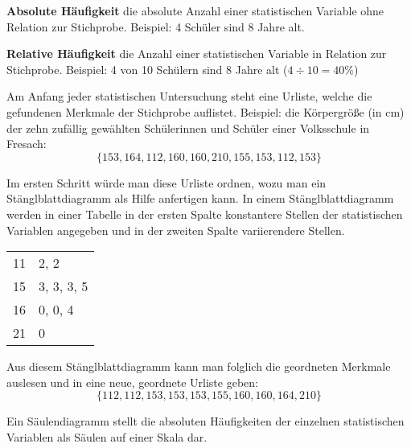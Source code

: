 \textbf{Absolute H\"{a}ufigkeit}  die absolute Anzahl einer statistischen Variable ohne Relation zur Stichprobe. Beispiel: 4 Sch\"{u}ler sind 8 Jahre alt.

\textbf{Relative H\"{a}ufigkeit}  die Anzahl einer statistischen Variable in Relation zur Stichprobe. Beispiel: 4 von 10 Sch\"{u}lern sind 8 Jahre alt ($4 \div 10 = 40\%$)

\pagebreak



Am Anfang jeder statistischen Untersuchung steht eine Urliste, welche die gefundenen Merkmale der Stichprobe auflistet. Beispiel: die K\"{o}rpergr\"{o}\ss{}e (in cm) der zehn zuf\"{a}llig gew\"{a}hlten Sch\"{u}lerinnen und Sch\"{u}ler einer Volksschule in Fresach: $$\{ 153, 164, 112, 160, 160, 210, 155, 153, 112, 153 \}$$


Im ersten Schritt w\"{u}rde man diese Urliste ordnen, wozu man ein St\"{a}nglblattdiagramm als Hilfe anfertigen kann. In einem St\"{a}nglblattdiagramm werden in einer Tabelle in der ersten Spalte konstantere Stellen der statistischen Variablen angegeben und in der zweiten Spalte variierendere Stellen.

\begin{table}[h!]
	\begin{tabular}{l | l}
		11 & 2, 2
		\\
		15 & 3, 3, 3, 5
		\\
		16 & 0, 0, 4
		\\
		21 & 0
	\end{tabular}
\end{table}

Aus diesem St\"{a}nglblattdiagramm kann man folglich die geordneten Merkmale auslesen und in eine neue, geordnete Urliste geben: $$\{ 112, 112, 153, 153, 153, 155, 160, 160, 164, 210\}$$


Ein S\"{a}ulendiagramm stellt die absoluten H\"{a}ufigkeiten der einzelnen statistischen Variablen als S\"{a}ulen auf einer Skala dar.

\begin{figure}[h!]
\end{figure}

